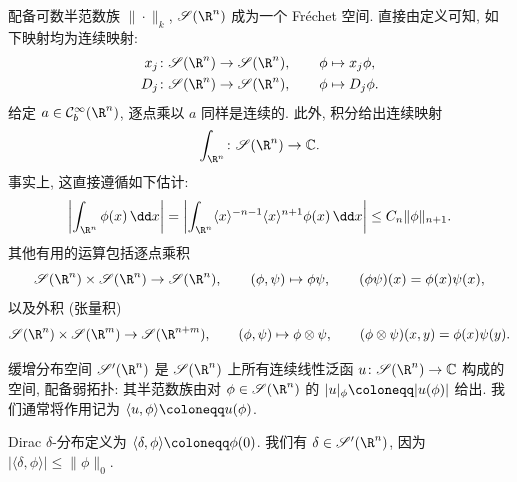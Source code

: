 配备可数半范数族 $\|\cdot\|_k$, $\Schwartz(\R^n)$ 成为一个 Fréchet 空间. 直接由定义可知, 如下映射均为连续映射:
\begin{equation}\label{eq:2.7}
    \begin{aligned}
        x_j &\colon \Schwartz(\R^n) \to \Schwartz(\R^n), \qquad \phi \mapsto x_j \phi, \\
        D_j &\colon \Schwartz(\R^n) \to \Schwartz(\R^n), \qquad \phi \mapsto D_j \phi.
    \end{aligned}
\end{equation}
给定 $a \in \mathcal{C}_b^\infty(\R^n)$, 逐点乘以 $a$ 同样是连续的. 此外, 积分给出连续映射
\begin{equation}\label{eq:2.8}
    \int_{\R^n} \colon \Schwartz(\R^n) \to \mathbb{C}.
\end{equation}
事实上, 这直接遵循如下估计:
\begin{equation}\label{eq:2.9}
    \left| \int_{\R^n} \phi(x) \,\dd x \right| = \left| \int_{\R^n} \langle x \rangle^{-n-1} \langle x \rangle^{n+1} \phi(x) \,\dd x \right| \le C_n \|\phi\|_{n+1}.
\end{equation}
其他有用的运算包括逐点乘积
\begin{equation}\label{eq:2.10}
    \Schwartz(\R^n) \times \Schwartz(\R^n) \to \Schwartz(\R^n), \qquad (\phi, \psi) \mapsto \phi\psi, \qquad (\phi\psi)(x) = \phi(x)\psi(x),
\end{equation}
以及外积 (张量积)
\begin{equation}\label{eq:2.11}
    \Schwartz(\R^n) \times \Schwartz(\R^m) \to \Schwartz(\R^{n+m}), \qquad (\phi, \psi) \mapsto \phi \otimes \psi, \qquad (\phi \otimes \psi)(x, y) = \phi(x)\psi(y).
\end{equation}

\begin{definition}[缓增分布]\label{def:2.3}
缓增分布空间 $\TempDistr(\R^n)$ 是 $\Schwartz(\R^n)$ 上所有连续线性泛函 $u \colon \Schwartz(\R^n) \to \mathbb{C}$ 构成的空间, 配备弱拓扑: 其半范数族由对 $\phi \in \Schwartz(\R^n)$ 的 $|u|_\phi \defeq |u(\phi)|$ 给出. 我们通常将作用记为 $\langle u, \phi \rangle \defeq u(\phi)$.
\end{definition}

\begin{example}[$\delta$-分布]\label{eg:2.4}
Dirac $\delta$-分布定义为 $\langle \delta, \phi \rangle \defeq \phi(0)$. 我们有 $\delta \in \TempDistr(\R^n)$, 因为 $|\langle \delta, \phi \rangle| \le \|\phi\|_0$.
\end{example}

